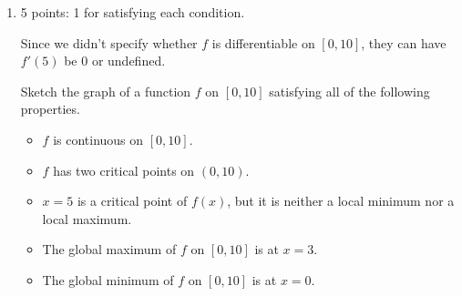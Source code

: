 \documentclass{article}
\begin{document}
\begin{enumerate}
\begin{enumerate}
    \begin{problem}[\vfill]
      Does $g$ have a global minimum on $[1, \infty)$? If so, where? Justify your answer. 
    \end{problem}

    \begin{solution}
      To determine whether there is a global minimum, we need to check the end behavior.
      At the left endpoint, $g(1)=\frac{1}{17}$. On the right side, we need to evaluate
      $\lim_{t \to \infty} g(t)$.
      \begin{align*}
        \lim_{t \to \infty} g(t) &= \lim_{t \to \infty} \frac{t^2}{t^4+16} \\
        \intertext{As $t\to\infty$, the dominant term in the denominator is $t^4$.}
        &= \lim_{t \to \infty} \frac{t^2}{t^4} \\
        &= \lim_{t \to \infty} \frac{1}{t^2} \\
        &= 0
      \end{align*}
      Based on this, we can say that $g$ does not have a global minimum on $[1, \infty)$.
    \end{solution}

  \end{enumerate}

  \begin{problemonly}
    \emph{Note:} You should have found 3 critical points. If you didn't, go back and fix it!
  \end{problemonly}

\item  

  \begin{grading}
    5 points: 1 for satisfying each condition.

    Since we didn't specify whether $f$ is differentiable on $[0, 10]$, they can have $f'(5)$ be 0 or undefined. 
  \end{grading}

  \begin{problem}[\nstretch{1.5}]
    Sketch the graph of a function $f$ on $[0, 10]$ satisfying all of the following properties.
    \begin{itemize}[nosep]
    \item $f$ is continuous on $[0, 10]$. 
    \item $f$ has two critical points on $(0, 10)$.
    \item $x = 5$ is a critical point of $f(x)$, but it is neither a local minimum nor a local maximum.
    \item The global maximum of $f$ on $[0, 10]$ is at $x = 3$.
    \item The global minimum of $f$ on $[0, 10]$ is at $x = 0$. 
    \end{itemize}
  \end{problem}


\end{enumerate}
\end{document}
